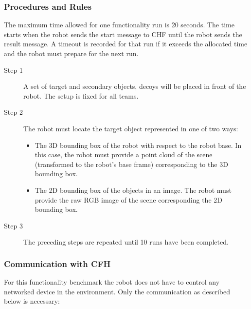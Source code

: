 \subsubsection{Procedures and Rules}
\label{sssec:ObjectPerceptionProcedures}

The maximum time allowed for one functionality run is 20 seconds. The time starts when the robot sends the start message to CHF until the robot sends the result message. A timeout is recorded for that run if it exceeds the allocated time and the robot must prepare for the next run.

\begin{description}
\item[Step 1] A set of target and secondary objects, decoys will be placed in front of the robot. The setup is fixed for all teams.
\item[Step 2] The robot must locate the target object represented in one of two ways:
	\begin{itemize}
	\item The 3D bounding box of the robot with respect to the robot base. In this case, the robot must provide a point cloud of the scene (transformed to the robot's base frame) corresponding to the 3D bounding box.
	\item The 2D bounding box of the objects in an image. The robot must provide the raw RGB image of the scene corresponding the 2D bounding box.
	\end{itemize}
\item[Step 3] The preceding steps are repeated until 10 runs have been completed.
\end{description}

\subsubsection{Communication with CFH}
\label{sssec:CommCFHObjectPerception}
For this functionality benchmark the robot does not have to control any networked device in the environment. Only the communication as described below is necessary:

